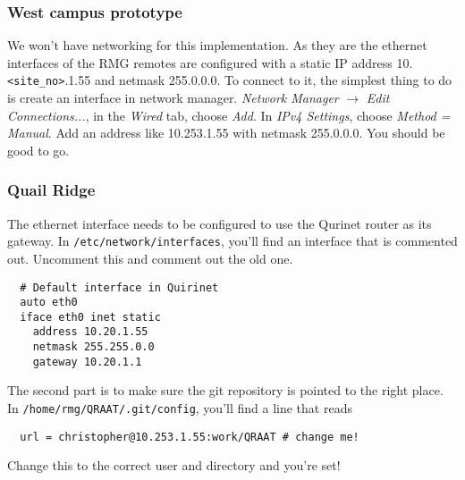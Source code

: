 \documentclass[letter]{article}
\begin{document}
\subsubsection{West campus prototype}
We won't have networking for this implementation. As they are the ethernet interfaces of the RMG 
remotes are configured with a static IP address 10.\texttt{<site\_no>}.1.55 and netmask 255.0.0.0. 
To connect to it, the simplest thing to do is create an interface 
in network manager. \textit{Network Manager} $\rightarrow$ \textit{Edit Connections...}, in the 
\textit{Wired} tab, choose \textit{Add}. In \textit{IPv4 Settings}, choose \textit{Method = Manual}. 
Add an address like 10.253.1.55 with netmask 255.0.0.0. You should be good to go.  

\subsubsection{Quail Ridge}
The ethernet interface needs to be configured to use the Qurinet router as its gateway. 
In \texttt{/etc/network/interfaces}, you'll find an interface that is commented out. 
Uncomment this and comment out the old one. 
\begin{verbatim}
  # Default interface in Quirinet
  auto eth0 
  iface eth0 inet static
    address 10.20.1.55
    netmask 255.255.0.0
    gateway 10.20.1.1
\end{verbatim}

The second part is to make sure the git repository is pointed to the right place. In 
\texttt{/home/rmg/QRAAT/.git/config}, you'll find a line that reads
\begin{verbatim}
  url = christopher@10.253.1.55:work/QRAAT # change me!
\end{verbatim}
Change this to the correct user and directory and you're set!
\end{document}
